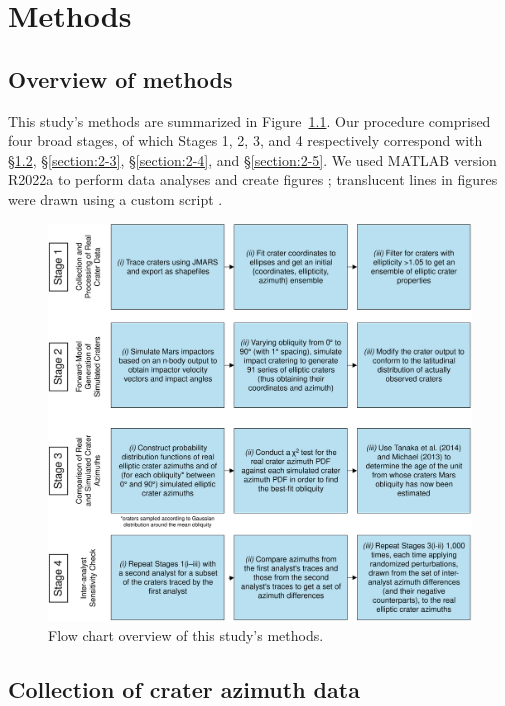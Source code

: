 \documentclass{ucetd}
\begin{document}
\chapter{Methods}
\label{chapter:2}

\section{Overview of methods}
\label{section:2-1}

This study’s methods are summarized in Figure~\ref{fig:2-1}. Our procedure comprised four broad stages, of which Stages 1, 2, 3, and 4 respectively correspond with §\ref{section:2-2}, §\ref{section:2-3}, §\ref{section:2-4}, and §\ref{section:2-5}. We used MATLAB version R2022a to perform data analyses and create figures \citep{MATLAB:2022}; translucent lines in figures were drawn using a custom script \citep{shoelson2012a}.

\begin{figure}
    \includegraphics[width=\textwidth]{figures/fig2_1.png}
    \caption[Flow chart overview of this study’s methods]{Flow chart overview of this study’s methods.}
    \label{fig:2-1}
\end{figure}

\section{Collection of crater azimuth data}
\label{section:2-2}
\end{document}
